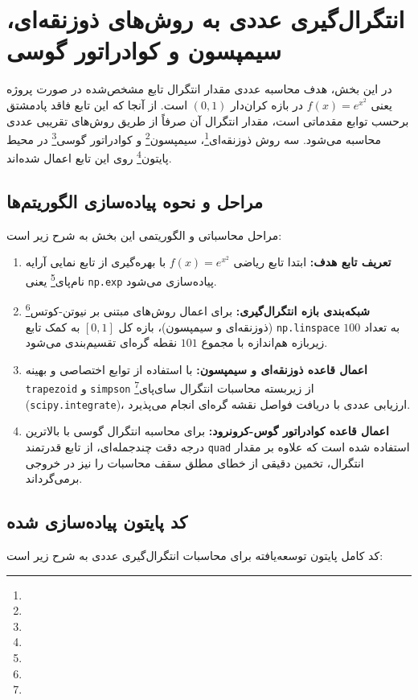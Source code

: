 \section{انتگرال‌گیری عددی به روش‌های ذوزنقه‌ای، سیمپسون و کوادراتور گوسی}
در این بخش، هدف محاسبه عددی مقدار انتگرال تابع مشخص‌شده در صورت پروژه یعنی $ f(x) = e^{x^2} $ در بازه کران‌دار $ (0,1) $ است. از آنجا که این تابع فاقد پادمشتق برحسب توابع مقدماتی است، مقدار انتگرال آن صرفاً از طریق روش‌های تقریبی عددی محاسبه می‌شود. سه روش ذوزنقه‌ای\footnote{}، سیمپسون\footnote{} و کوادراتور گوسی\footnote{} در محیط پایتون\footnote{} روی این تابع اعمال شده‌اند.

\subsection{مراحل و نحوه پیاده‌سازی الگوریتم‌ها}
مراحل محاسباتی و الگوریتمی این بخش به شرح زیر است:
\begin{enumerate}
    \item \textbf{تعریف تابع هدف:} ابتدا تابع ریاضی $ f(x) = e^{x^2} $ با بهره‌گیری از تابع نمایی آرایه نام‌پای\footnote{} یعنی \lstinline|np.exp| پیاده‌سازی می‌شود.
    \item \textbf{شبکه‌بندی بازه انتگرال‌گیری:} برای اعمال روش‌های مبتنی بر نیوتن-کوتس\footnote{} (ذوزنقه‌ای و سیمپسون)، بازه کل $ [0, 1] $ به کمک تابع \lstinline|np.linspace| به تعداد $ 100 $ زیربازه هم‌اندازه با مجموع $ 101 $ نقطه گره‌ای تقسیم‌بندی می‌شود.
    \item \textbf{اعمال قاعده‌ ذوزنقه‌ای و سیمپسون:} با استفاده از توابع اختصاصی و بهینه \lstinline|trapezoid| و \lstinline|simpson| از زیربسته محاسبات انتگرال سای‌پای\footnote{} (\lstinline|scipy.integrate|)، ارزیابی عددی با دریافت فواصل نقشه گره‌ای انجام می‌پذیرد.
    \item \textbf{اعمال قاعده‌ کوادراتور گوس-کرونرود:} برای محاسبه انتگرال گوسی با بالاترین درجه دقت چندجمله‌ای، از تابع قدرتمند \lstinline|quad| استفاده شده است که علاوه بر مقدار انتگرال، تخمین دقیقی از خطای مطلق سقف محاسبات را نیز در خروجی برمی‌گرداند.
\end{enumerate}

\subsection{کد پایتون پیاده‌سازی شده}
کد کامل پایتون توسعه‌یافته برای محاسبات انتگرال‌گیری عددی به شرح زیر است:

